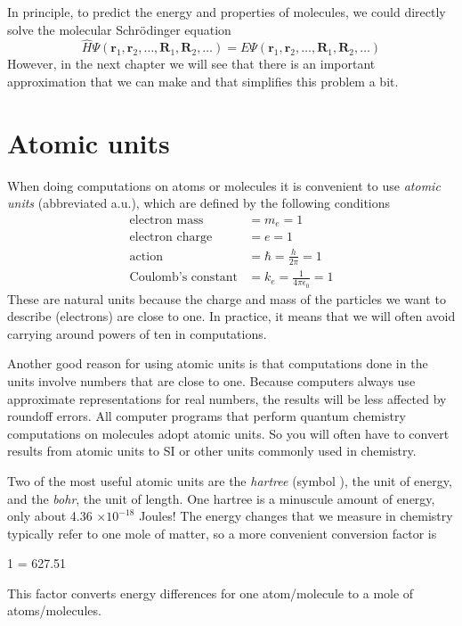 \documentclass[../Main/notes.tex]{subfiles}
\begin{document}
In principle, to predict the energy and properties of molecules, we could directly solve the molecular Schr\"{o}dinger equation
\begin{equation}
\hat{H} \Psi(\mathbf{r}_1, \mathbf{r}_2, \ldots, \mathbf{R}_1,  \mathbf{R}_2,\ldots) = E \Psi(\mathbf{r}_1, \mathbf{r}_2, \ldots, \mathbf{R}_1,  \mathbf{R}_2,\ldots)
\end{equation}
However, in the next chapter we will see that there is an important approximation that we can make and that simplifies this problem a bit.

\section{Atomic units}
When doing computations on atoms or molecules it is convenient to use \emph{atomic units} (abbreviated a.u.), which are defined by the following conditions
\begin{align}
\text{electron mass} & = m_e = 1\\
\text{electron charge} & = e = 1\\
\text{action} & = \hbar = \frac{h}{2\pi} = 1\\
\text{Coulomb's constant} & = k_e = \frac{1}{4\pi \epsilon_0} = 1
\end{align}
These are natural units because the charge and mass of the particles we want to describe (electrons) are close to one.
In practice, it means that we will often avoid carrying around powers of ten in computations.

Another good reason for using atomic units is that computations done in the units involve numbers that are close to one.
Because computers always use approximate representations for real numbers, the results will be less affected by roundoff errors.
All computer programs that perform quantum chemistry computations on molecules adopt atomic units.
So you will often have to convert results from atomic units to SI or other units commonly used in chemistry.

Two of the most useful atomic units are the \emph{hartree} (symbol  \Eh), the unit of energy, and the \emph{bohr}, the unit of length.
One hartree is a minuscule amount of energy, only about 4.36 $\times 10^{-18}$ Joules!
The energy changes that we measure in chemistry typically refer to one mole of matter, so a more convenient conversion factor is 
\begin{iequation}
1  = 627.51 
\end{iequation}
This factor converts energy differences for one atom/molecule to a mole of atoms/molecules.
\end{document}
